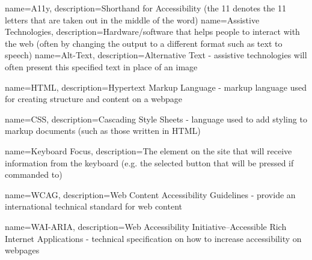 {
    name=A11y,
    description={Shorthand for Accessibility (the 11 denotes the 11 letters that are taken out in the middle of the word)}
}
%
{
    name=Assistive Technologies,
    description={Hardware/software that helps people to interact with the web (often by changing the output to a different format such as text to speech)}
}
%
{
    name=Alt-Text,
    description={Alternative Text - assistive technologies will often present this specified text in place of an image}
}

{
    name=HTML,
    description=Hypertext Markup Language - markup language used for creating structure and content on a webpage
}

{
    name=CSS,
    description=Cascading Style Sheets - language used to add styling to markup documents (such as those written in HTML)
}

{
    name=Keyboard Focus,
    description=The element on the site that will receive information from the keyboard (e.g. the selected button that will be pressed if commanded to)
}

{
    name=WCAG,
    description=Web Content Accessibility Guidelines - provide an international technical standard for web content
}

{
    name=WAI-ARIA,
    description=Web Accessibility Initiative–Accessible Rich Internet Applications - technical specification on how to increase accessibility on webpages
}

